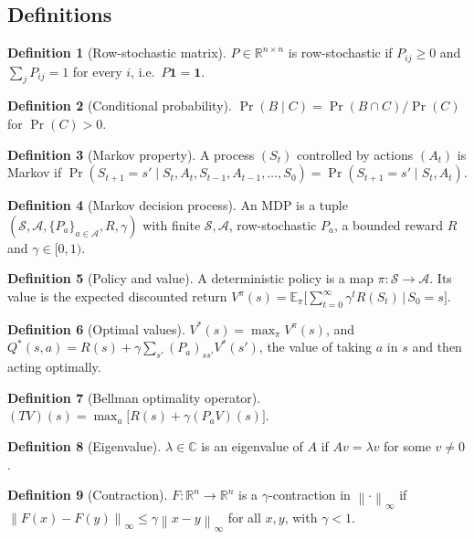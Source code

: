 \documentclass[10pt]{article}
\theoremstyle{definition}
\newtheorem{definition}{Definition}
\newcommand{\R}{\mathbb{R}}
\newcommand{\E}{\mathbb{E}}
\newcommand{\one}{\mathbf{1}}
\newcommand{\norm}[1]{\left\lVert #1\right\rVert_\infty}
\newcommand{\Sset}{\mathcal{S}}
\newcommand{\Aset}{\mathcal{A}}
\begin{document}
\subsection{Definitions}

\begin{definition}[Row-stochastic matrix]
$P\in\R^{n\times n}$ is row-stochastic if $P_{ij}\ge 0$ and $\sum_j P_{ij} = 1$ for every $i$, i.e.\ $P\one = \one$.
\end{definition}

\begin{definition}[Conditional probability]
$\Pr(B\mid C) = \Pr(B\cap C)/\Pr(C)$ for $\Pr(C)>0$.
\end{definition}

\begin{definition}[Markov property]
A process $(S_t)$ controlled by actions $(A_t)$ is Markov if $\Pr(S_{t+1}=s'\mid S_t, A_t, S_{t-1}, A_{t-1},\dots,S_0) = \Pr(S_{t+1}=s'\mid S_t, A_t)$.
\end{definition}

\begin{definition}[Markov decision process]
An MDP is a tuple $(\Sset,\Aset,\{P_a\}_{a\in\Aset},R,\gamma)$ with finite $\Sset,\Aset$, row-stochastic $P_a$, a bounded reward $R$ and $\gamma\in[0,1)$.
\end{definition}

\begin{definition}[Policy and value]
A deterministic policy is a map $\pi:\Sset\to\Aset$. Its value is the expected discounted return $V^\pi(s) = \E_\pi\big[\sum_{t=0}^\infty \gamma^t R(S_t)\,\big|\,S_0 = s\big]$.
\end{definition}

\begin{definition}[Optimal values]
$V^*(s) = \max_\pi V^\pi(s)$, and $Q^*(s,a) = R(s) + \gamma\sum_{s'}(P_a)_{ss'}V^*(s')$, the value of taking $a$ in $s$ and then acting optimally.
\end{definition}

\begin{definition}[Bellman optimality operator]
$(TV)(s) = \max_a\big[R(s) + \gamma (P_aV)(s)\big]$.
\end{definition}

\begin{definition}[Eigenvalue]
$\lambda\in\mathbb{C}$ is an eigenvalue of $A$ if $Av = \lambda v$ for some $v\ne 0$.
\end{definition}

\begin{definition}[Contraction]
$F:\R^n\to\R^n$ is a $\gamma$-contraction in $\norm{\cdot}$ if $\norm{F(x)-F(y)}\le\gamma\norm{x-y}$ for all $x,y$, with $\gamma<1$.
\end{definition}
\end{document}
